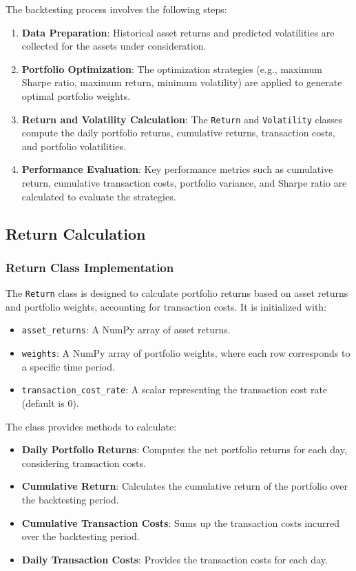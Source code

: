 The backtesting process involves the following steps:

\begin{enumerate}
    \item \textbf{Data Preparation}: Historical asset returns and predicted volatilities are collected for the assets under consideration.
    \item \textbf{Portfolio Optimization}: The optimization strategies (e.g., maximum Sharpe ratio, maximum return, minimum volatility) are applied to generate optimal portfolio weights.
    \item \textbf{Return and Volatility Calculation}: The \texttt{Return} and \texttt{Volatility} classes compute the daily portfolio returns, cumulative returns, transaction costs, and portfolio volatilities.
    \item \textbf{Performance Evaluation}: Key performance metrics such as cumulative return, cumulative transaction costs, portfolio variance, and Sharpe ratio are calculated to evaluate the strategies.
\end{enumerate}

\subsection{Return Calculation}

\subsubsection{Return Class Implementation}

The \texttt{Return} class is designed to calculate portfolio returns based on asset returns and portfolio weights, accounting for transaction costs. It is initialized with:

\begin{itemize}
    \item \texttt{asset\_returns}: A NumPy array of asset returns.
    \item \texttt{weights}: A NumPy array of portfolio weights, where each row corresponds to a specific time period.
    \item \texttt{transaction\_cost\_rate}: A scalar representing the transaction cost rate (default is 0).
\end{itemize}

The class provides methods to calculate:

\begin{itemize}
    \item \textbf{Daily Portfolio Returns}: Computes the net portfolio returns for each day, considering transaction costs.
    \item \textbf{Cumulative Return}: Calculates the cumulative return of the portfolio over the backtesting period.
    \item \textbf{Cumulative Transaction Costs}: Sums up the transaction costs incurred over the backtesting period.
    \item \textbf{Daily Transaction Costs}: Provides the transaction costs for each day.
\end{itemize}

